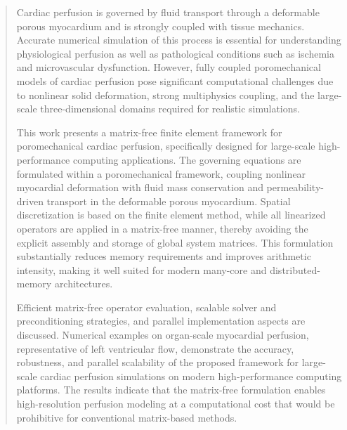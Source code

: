 \documentclass[smallcondensed]{svjour3}     %
\begin{document}
\begin{abstract}
	Cardiac perfusion is governed by fluid transport through a deformable porous myocardium and is strongly coupled with tissue mechanics. Accurate numerical simulation of this process is essential for understanding physiological perfusion as well as pathological conditions such as ischemia and microvascular dysfunction. However, fully coupled poromechanical models of cardiac perfusion pose significant computational challenges due to nonlinear solid deformation, strong multiphysics coupling, and the large-scale three-dimensional domains required for realistic simulations.

	This work presents a matrix-free finite element framework for poromechanical cardiac perfusion, specifically designed for large-scale high-performance computing applications. The governing equations are formulated within a poromechanical framework, coupling nonlinear myocardial deformation with fluid mass conservation and permeability-driven transport in the deformable porous myocardium. Spatial discretization is based on the finite element method, while all linearized operators are applied in a matrix-free manner, thereby avoiding the explicit assembly and storage of global system matrices. This formulation substantially reduces memory requirements and improves arithmetic intensity, making it well suited for modern many-core and distributed-memory architectures.

	Efficient matrix-free operator evaluation, scalable solver and preconditioning strategies, and parallel implementation aspects are discussed. Numerical examples on organ-scale myocardial perfusion, representative of left ventricular flow, demonstrate the accuracy, robustness, and parallel scalability of the proposed framework for large-scale cardiac perfusion simulations on modern high-performance computing platforms. The results indicate that the matrix-free formulation enables high-resolution perfusion modeling at a computational cost that would be prohibitive for conventional matrix-based methods.


\end{abstract}
\end{document}
